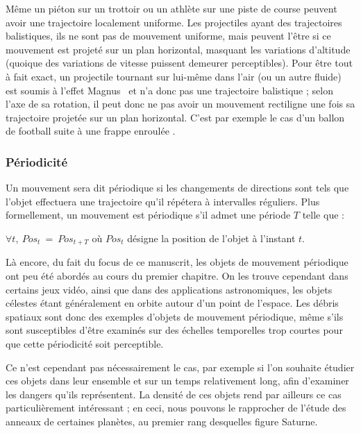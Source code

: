 	
	Même un piéton sur un trottoir ou un athlète sur une piste de course peuvent avoir une trajectoire localement uniforme. Les projectiles ayant des trajectoires balistiques, ils ne sont pas de mouvement uniforme, mais peuvent l'être si ce mouvement est projeté sur un plan horizontal, masquant les variations d'altitude (quoique des variations de vitesse puissent demeurer perceptibles). Pour être tout à fait exact, un projectile tournant sur lui-même dans l'air (ou un autre fluide) est soumis à l'effet Magnus~\cite{magnus1853ueber, briggs1959effect} et n'a donc pas une trajectoire balistique ; selon l'axe de sa rotation, il peut donc ne pas avoir un mouvement rectiligne une fois sa trajectoire projetée sur un plan horizontal. C'est par exemple le cas d'un ballon de football suite à une \og frappe enroulée \fg{}.

	\subsubsection{Périodicité}
	Un mouvement sera dit périodique si les changements de directions sont tels que l'objet effectuera une trajectoire qu'il répétera à intervalles réguliers. Plus formellement, un mouvement est périodique s'il admet une période $T$ telle que :
	
	$\forall t,~Pos_{t}~=~Pos_{t+T}$ où $Pos_{t}$ désigne la position de l'objet à l'instant $t$.
	
	Là encore, du fait du focus de ce manuscrit, les objets de mouvement périodique ont peu été abordés au cours du premier chapitre. On les trouve cependant dans certains jeux vidéo, ainsi que dans des applications astronomiques, les objets célestes étant généralement en orbite autour d'un point de l'espace. Les débris spatiaux sont donc des exemples d'objets de mouvement périodique, même s'ils sont susceptibles d'être examinés sur des échelles temporelles trop courtes pour que cette périodicité soit perceptible.
	
	Ce n'est cependant pas nécessairement le cas, par exemple si l'on souhaite étudier ces objets dans leur ensemble et sur un temps relativement long, afin d'examiner les dangers qu'ils représentent. La densité de ces objets rend par ailleurs ce cas particulièrement intéressant ; en ceci, nous pouvons le rapprocher de l'étude des anneaux de certaines planètes, au premier rang desquelles figure Saturne\footnotemark{}.
	
